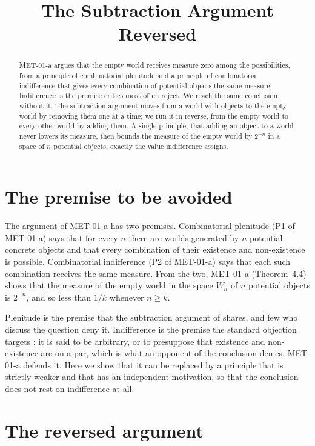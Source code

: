 \documentclass{situationist-preprint}
\title{The Subtraction Argument Reversed}
\begin{document}
\maketitle

\begin{abstract}
MET-01-a argues that the empty world receives measure zero among the possibilities, from a principle of combinatorial plenitude and a principle of combinatorial indifference that gives every combination of potential objects the same measure. Indifference is the premise critics most often reject. We reach the same conclusion without it. The subtraction argument moves from a world with objects to the empty world by removing them one at a time; we run it in reverse, from the empty world to every other world by adding them. A single principle, that adding an object to a world never lowers its measure, then bounds the measure of the empty world by $2^{-n}$ in a space of $n$ potential objects, exactly the value indifference assigns.
\end{abstract}

\section{The premise to be avoided}

The argument of MET-01-a has two premises. Combinatorial plenitude (P1 of MET-01-a) says that for every $n$ there are worlds generated by $n$ potential concrete objects and that every combination of their existence and non-existence is possible. Combinatorial indifference (P2 of MET-01-a) says that each such combination receives the same measure. From the two, MET-01-a (Theorem~4.4) shows that the measure of the empty world in the space $W_n$ of $n$ potential objects is $2^{-n}$, and so less than $1/k$ whenever $n \geq k$.

Plenitude is the premise that the subtraction argument of \citet{Baldwin1996} shares, and few who discuss the question deny it. Indifference is the premise the standard objection targets \citep{Lowe1996,Grunbaum2004}: it is said to be arbitrary, or to presuppose that existence and non-existence are on a par, which is what an opponent of the conclusion denies. MET-01-a defends it. Here we show that it can be replaced by a principle that is strictly weaker and that has an independent motivation, so that the conclusion does not rest on indifference at all.

\section{The reversed argument}
\end{document}
